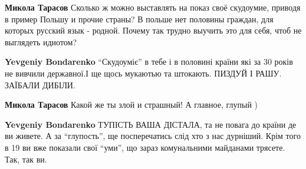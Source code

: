 \begin{itemize}

\textbf{Микола Тарасов} Сколько ж можно выставлять на показ своё скудоумие,
приводя в пример Польшу и прочие страны? В польше нет половины граждан, для
которых русский язык - родной. Почему так трудно выучить это для себя, чтоб не
выглядеть идиотом?


\textbf{Yevgeniy Bondarenko} \enquote{Скудоуміє} в тебе і в половині країни які за 30
років не вивчили державної.І ще щось мукаютью та штокають. ПИЗДУЙ І РАШУ.
ЗАЇБАЛИ ДИБІЛИ.


\textbf{Микола Тарасов} Какой же ты злой и страшный!
А главное, глупый )


\textbf{Yevgeniy Bondarenko} ТУПІСТЬ ВАША ДІСТАЛА, та не повага до країни де ви
живете. А за \enquote{глупость}, ще посперечатись слід хто з нас дурніший. Крім того в
19 ви вже показали свої \enquote{уми}, що зараз комунальними майданами трясете. Так,
так ви.

\end{itemize}

